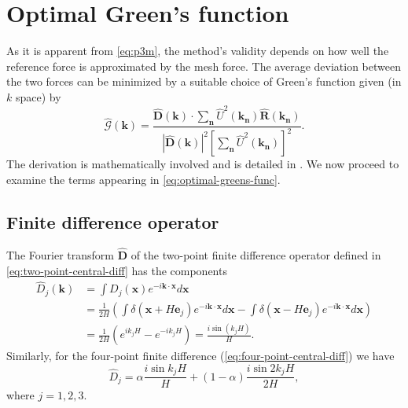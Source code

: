 \section{Optimal Green's function}
As it is apparent from \autoref{eq:p3m}, the method's validity depends on how well the reference force is approximated by the mesh force.
The average deviation between the two forces can be minimized by a suitable choice of Green's function given (in $k$ space) by
\begin{equation}\label{eq:optimal-greens-func}
    \hat{\mathcal{G}}(\mathbf{k}) = \frac{\mathbf{\hat{D}}(\mathbf{k}) \cdot \sum_{\mathbf{n}}\hat{U}^2(\mathbf{k_\mathbf{n}}) \mathbf{\hat{R}}(\mathbf{k}_\mathbf{n})}{|\mathbf{\hat{D}}(\mathbf{k})|^2 \left[ \sum_{\mathbf{n}}\hat{U}^2(\mathbf{k}_\mathbf{n}) \right]^2}.
\end{equation}
The derivation is mathematically involved and is detailed in \cite{Hockney1988}.
We now proceed to examine the terms appearing in \autoref{eq:optimal-greens-func}.

\subsection{Finite difference operator}
The Fourier transform $\mathbf{\hat{D}}$ of the two-point finite difference operator defined in \autoref{eq:two-point-central-diff} has the components
\begin{align*}
    \hat{D}_j(\mathbf{k})
     & = \int D_j(\mathbf{x}) e^{-i\mathbf{k}\cdot \mathbf{x}} d\mathbf{x}                                                                                                                                      \\
     & = \frac{1}{2H}\left( \int \delta(\mathbf{x} + H\mathbf{e}_j)e^{-i \mathbf{k}\cdot \mathbf{x}} d\mathbf{x} - \int \delta(\mathbf{x} - H\mathbf{e}_j)e^{-i \mathbf{k}\cdot \mathbf{x}} d\mathbf{x} \right) \\
     & = \frac{1}{2H} (e^{ik_j H} - e^{-ik_j H})
    = \frac{i \sin(k_j H)}{H}.
\end{align*}
Similarly, for the four-point finite difference (\autoref{eq:four-point-central-diff}) we have
\begin{equation*}
    \hat{D}_j = \alpha\frac{i\sin k_j H}{H} + (1- \alpha)\frac{i\sin 2k_j H}{2H},
\end{equation*}
where $j=1,2,3$.

